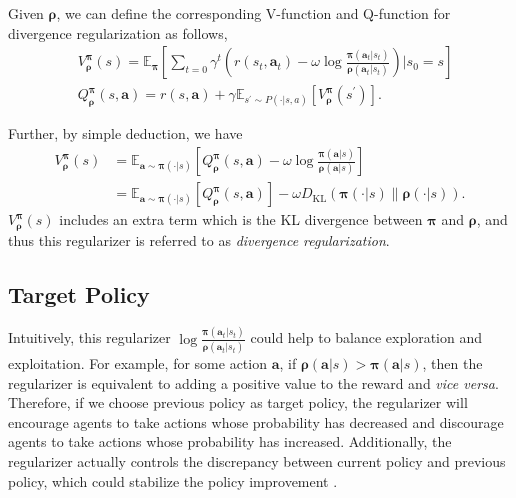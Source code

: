 \documentclass{article}
\begin{document}
Given $\bm{\rho}$, we can define the corresponding V-function and Q-function for divergence regularization as follows,
\begin{align*}
	& V_{\bm{\rho}}^{{\bm{\pi}}}(s) = \mathbb{E}_{\bm{\pi}}\left[ \sum_{t = 0} \gamma^t (r(s_t,\bm{a}_t ) - \omega \log \frac{{\bm{\pi}}(\bm{a}_t|s_t)}{{\bm{\rho}}(\bm{a}_t|s_t)} ) | s_0 = s \right] \\
	& Q_{\bm{\rho}}^{{\bm{\pi}}}(s,\bm{a}) = r(s,\bm{a}) + \gamma \mathbb{E}_{s^\prime \sim P(\cdot | s, a)}\left[ V_{\bm{\rho}}^{\bm{\pi}}(s^\prime) \right].
\end{align*} 

Further, by simple deduction, we have
\begin{align*}
	V_{\bm{\rho}}^{\bm{\pi}}(s) 
	& = \mathbb{E}_{\bm{a} \sim \bm{\pi}(\cdot| s)}\left[ Q_{\bm{\rho}}^{{\bm{\pi}}}(s,\bm{a}) - \omega \log \frac{{\bm{\pi}}(\bm{a}|s)}{{\bm{\rho}}(\bm{a}|s)}\right] \\
	& = \mathbb{E}_{\bm{a} \sim \bm{\pi}(\cdot| s)}\left[Q_{\bm{\rho}}^{\bm{\pi}}(s,\bm{a}) \right] - \omega D_{\operatorname{KL}}\left( {\bm{\pi}}(\cdot|s) \| {\bm{\rho}}(\cdot|s) \right). \nonumber
\end{align*}
$V_{\bm{\rho}}^{\bm{\pi}}(s)$ includes an extra term which is the KL divergence between ${\bm{\pi}}$ and ${\bm{\rho}}$, and thus this regularizer is referred to as \textit{divergence regularization}.

\subsection{Target Policy}



Intuitively, this regularizer $\log\frac{{\bm{\pi}}(\bm{a}_t|s_t)}{{\bm{\rho}}(\bm{a}_t|s_t)}$ could help to balance exploration and exploitation. For example, for some action $\bm{a}$, if ${\bm{\rho}}(\bm{a}|s) > {\bm{\pi}}(\bm{a}|s)$, then the regularizer is equivalent to adding a positive value to the reward and \textit{vice versa}. Therefore, if we choose previous policy as target policy, the regularizer will encourage agents to take actions whose probability has decreased and discourage agents to take actions whose probability has increased. Additionally, the regularizer actually controls the discrepancy between current policy and previous policy, which could stabilize the policy improvement \citep{CPI,TRPO,PPO}.
\end{document}
